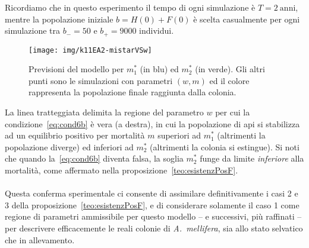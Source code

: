 Ricordiamo che in questo esperimento il
tempo di ogni simulazione è $T=2~\text{anni}$, mentre la popolazione iniziale $b=H(0)+F(0)$ è scelta
casualmente per ogni simulazione tra $b_-=50$ e $b_+ =9000$ individui.

\begin{figure}[hbp]
    \centering
    \texttt{[image: img/k11EA2-mistarVSw]}

    \caption[Esperimento A, soglie di mortalità]{Previsioni del modello per $m_1^*$ (in blu) ed $m_2^*$ (in verde).
        Gli altri punti sono le simulazioni con parametri $(w,m)$ ed il colore rappresenta la popolazione
        finale raggiunta dalla colonia.
    }

    \label{img:kh11expA24}
\end{figure}

La linea tratteggiata delimita la regione del parametro $w$ per cui la condizione~\eqref{eq:cond6b} è vera (a destra),
in cui la popolazione di api si stabilizza ad un equilibrio positivo per mortalità $m$ superiori ad $m_1^*$
(altrimenti la popolazione diverge) ed inferiori ad $m_2^*$ (altrimenti la colonia si estingue).
Si noti che quando la~\eqref{eq:cond6b} diventa falsa, la soglia $m_2^*$ funge
da limite \emph{inferiore} alla mortalità, come affermato nella proposizione~\ref{teo:esistenzPosF}.

\paragraph{}
Questa conferma sperimentale ci consente di assimilare definitivamente i casi 2 e 3 della
proposizione~\ref{teo:esistenzPosF}, e di considerare solamente il caso 1 come regione di parametri ammissibile
per questo modello -- e successivi, più raffinati -- per descrivere efficacemente le reali colonie di \emph{A.~mellifera},
sia allo stato selvatico che in allevamento.
